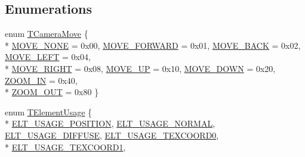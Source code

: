 \subsection*{Enumerations}
\begin{DoxyCompactItemize}
\item 
enum \hyperlink{namespace_agmd_afacd7ff2b34d5b64625050e09d14424f}{T\+Camera\+Move} \{ \\*
\hyperlink{namespace_agmd_afacd7ff2b34d5b64625050e09d14424faee389384b7803728e8488c9dbcb88feb}{M\+O\+V\+E\+\_\+\+N\+O\+N\+E} = 0x00, 
\hyperlink{namespace_agmd_afacd7ff2b34d5b64625050e09d14424fa32b9518907e1ae944e0f604a40e9c3f4}{M\+O\+V\+E\+\_\+\+F\+O\+R\+W\+A\+R\+D} = 0x01, 
\hyperlink{namespace_agmd_afacd7ff2b34d5b64625050e09d14424fa3f9e219633d25af1d8c5f1114dfb9e90}{M\+O\+V\+E\+\_\+\+B\+A\+C\+K} = 0x02, 
\hyperlink{namespace_agmd_afacd7ff2b34d5b64625050e09d14424fa4615b4c9a22d0449115e5a7648451210}{M\+O\+V\+E\+\_\+\+L\+E\+F\+T} = 0x04, 
\\*
\hyperlink{namespace_agmd_afacd7ff2b34d5b64625050e09d14424fa1141ed0def41679b78695fa23b53269d}{M\+O\+V\+E\+\_\+\+R\+I\+G\+H\+T} = 0x08, 
\hyperlink{namespace_agmd_afacd7ff2b34d5b64625050e09d14424faab74a6ff86a5d11fa24840b114e13166}{M\+O\+V\+E\+\_\+\+U\+P} = 0x10, 
\hyperlink{namespace_agmd_afacd7ff2b34d5b64625050e09d14424fa3cef1f46c60cff593159a67515545a36}{M\+O\+V\+E\+\_\+\+D\+O\+W\+N} = 0x20, 
\hyperlink{namespace_agmd_afacd7ff2b34d5b64625050e09d14424fa73260f27ee36b3d550c5dec4104241a8}{Z\+O\+O\+M\+\_\+\+I\+N} = 0x40, 
\\*
\hyperlink{namespace_agmd_afacd7ff2b34d5b64625050e09d14424fa5fc6381c0e0bdbfb400611d77c9ff307}{Z\+O\+O\+M\+\_\+\+O\+U\+T} = 0x80
 \}
\item 
enum \hyperlink{namespace_agmd_aaba68a0428288d99d1044a9563c33970}{T\+Element\+Usage} \{ \\*
\hyperlink{namespace_agmd_aaba68a0428288d99d1044a9563c33970a90e9270d1f05af5ceb92d142fc51d1d7}{E\+L\+T\+\_\+\+U\+S\+A\+G\+E\+\_\+\+P\+O\+S\+I\+T\+I\+O\+N}, 
\hyperlink{namespace_agmd_aaba68a0428288d99d1044a9563c33970abc51a929133a21bbd4703f7eb32c7b6e}{E\+L\+T\+\_\+\+U\+S\+A\+G\+E\+\_\+\+N\+O\+R\+M\+A\+L}, 
\hyperlink{namespace_agmd_aaba68a0428288d99d1044a9563c33970a762f259d57b87cafb9334d9032f8520b}{E\+L\+T\+\_\+\+U\+S\+A\+G\+E\+\_\+\+D\+I\+F\+F\+U\+S\+E}, 
\hyperlink{namespace_agmd_aaba68a0428288d99d1044a9563c33970a3fe59558b87ca5fd79b356b8d230c6fc}{E\+L\+T\+\_\+\+U\+S\+A\+G\+E\+\_\+\+T\+E\+X\+C\+O\+O\+R\+D0}, 
\\*
\hyperlink{namespace_agmd_aaba68a0428288d99d1044a9563c33970a96aa14636d12eeb14f874f6fcc0736f8}{E\+L\+T\+\_\+\+U\+S\+A\+G\+E\+\_\+\+T\+E\+X\+C\+O\+O\+R\+D1}, 

\end{DoxyCompactItemize}
